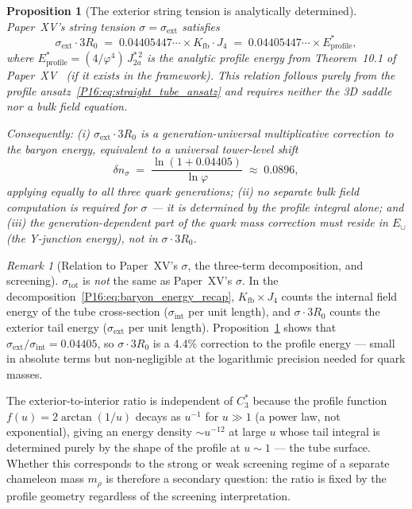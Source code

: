 \documentclass[11pt,a4paper]{article}
\newtheorem{proposition}[theorem]{Proposition}
\theoremstyle{definition}\newtheorem{definition}[theorem]{Definition}
\theoremstyle{remark}
\newtheorem{remark}[theorem]{Remark}
\theoremstyle{definition}\newtheorem{construction}[theorem]{Construction}
\newcommand{\vp}{\varphi}
\newcommand{\Kfb}{K_{\mathrm{fb}}}
\begin{document}
\begin{proposition}[The exterior string tension is analytically determined]
\label{P16:prop:sigma_ext_formula}
Paper~XV's string tension $\sigma = \sigma_{\mathrm{ext}}$ satisfies
\begin{equation}
  \sigma_{\mathrm{ext}} \cdot 3R_0
  \;=\; 0.04405447\cdots \times \Kfb\!\cdot\!J_4
  \;=\; 0.04405447\cdots \times E_{\mathrm{profile}}^*,
  \label{P16:eq:sigma_ext_formula}
\end{equation}
where $E_{\mathrm{profile}}^* = (4/\vp^4)\,J_{2a}^{*\,2}$ is the
analytic profile energy from Theorem~10.1 of Paper~XV~\cite{Paper15}
(if it exists in the framework). This relation follows purely from the
profile ansatz~\eqref{P16:eq:straight_tube_ansatz} and requires neither
the 3D saddle nor a bulk field equation.

Consequently: (i) $\sigma_{\mathrm{ext}}\cdot 3R_0$ is a
generation-\emph{universal} multiplicative correction to the baryon
energy, equivalent to a universal tower-level shift
\begin{equation}
  \delta n_{\sigma} \;=\; \frac{\ln(1+0.04405)}{\ln\vp}
  \;\approx\; 0.0896,
\end{equation}
applying equally to all three quark generations;
(ii) no separate bulk field computation is required for $\sigma$ ---
it is determined by the profile integral alone; and (iii) the
generation-\emph{dependent} part of the quark mass correction must
reside in $E_\cup$ (the Y-junction energy), not in $\sigma\cdot3R_0$.
\end{proposition}

\begin{remark}[Relation to Paper~XV's $\sigma$, the three-term decomposition, and screening]
\label{P16:rem:sigma_decomposition}
$\sigma_{\mathrm{tot}}$ is \emph{not} the same as Paper~XV's $\sigma$.
In the decomposition~\eqref{P16:eq:baryon_energy_recap}, $\Kfb\times J_4$
counts the internal field energy of the tube cross-section
($\sigma_{\mathrm{int}}$ per unit length), and $\sigma\cdot3R_0$ counts
the exterior tail energy ($\sigma_{\mathrm{ext}}$ per unit length).
Proposition~\ref{P16:prop:sigma_ext_formula} shows that
$\sigma_{\mathrm{ext}}/\sigma_{\mathrm{int}}=0.04405$, so $\sigma\cdot3R_0$
is a 4.4\% correction to the profile energy --- small in absolute terms but
non-negligible at the logarithmic precision needed for quark masses.

The exterior-to-interior ratio is independent of $C_3^*$ because the
profile function $f(u) = 2\arctan(1/u)$ decays as $u^{-1}$ for $u\gg1$
(a power law, not exponential), giving an energy density $\sim u^{-12}$
at large $u$ whose tail integral is determined purely by the shape of
the profile at $u\sim1$ --- the tube surface. Whether this corresponds
to the strong or weak screening regime of a separate chameleon mass
$m_\rho$ is therefore a secondary question: the ratio is fixed by the
profile geometry regardless of the screening interpretation.
\end{remark}
\end{document}
